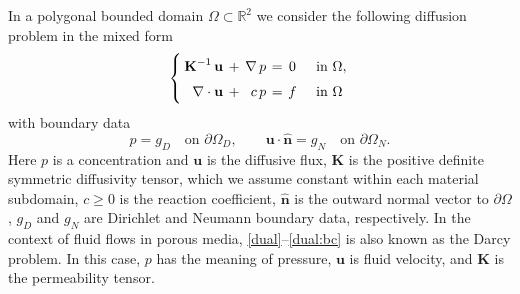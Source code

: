 \documentclass[12pt]{article}
\newcommand{\vect}[1]{\boldsymbol{\mathbf{#1}}}
\newcommand{\Rn}[1]{{\mathbb R^{#1}}}
\begin{document}
	In a polygonal bounded domain $\Omega \subset \Rn{2}$  we consider the following diffusion problem in the mixed form
	\begin{equation}\label{dual}
		\arraycolsep=2pt\def\arraystretch{1.5}
			\left\{\begin{array}{rcrccl}
			\vect K^{-1}\,\vect u & + & \nabla\,p & = & 0 &\quad\text{in } \Omega , \\
			\nabla\cdot\vect u    & + & c\,p      & = & f &\quad\text{in } \Omega
		\end{array}\right.
	\end{equation}
	with boundary data
	\begin{equation}
		p = g_D \quad\text{on } \partial\Omega_D,\qquad %
		\vect u \cdot \hat{\vect n} = g_N \quad\text{on } \partial\Omega_N. \label{dual:bc}
	\end{equation}
	Here $p$ is a concentration and $\vect u$ is the diffusive flux, $\vect K$ is the positive definite  symmetric diffusivity tensor, which we assume constant within each material subdomain, $c\ge0$ is the reaction coefficient, $\hat{\vect n}$ is the outward normal vector to $\partial\Omega$, $g_D$ and $g_N$ are Dirichlet and Neumann boundary data, respectively. In the context of fluid flows in porous media, \eqref{dual}--\eqref{dual:bc} is also known as the Darcy problem. In this case, $p$ has the meaning of pressure, $\vect u$ is fluid velocity, and $\vect K$ is the permeability tensor.
	
\end{document}
